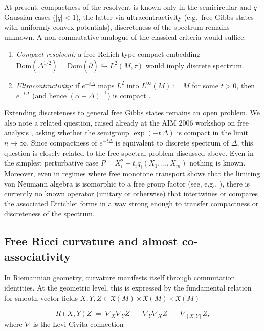 \documentclass[10pt,a4paper,reqno]{amsart}
\newcommand{\Dom}{\mathrm{Dom}}
\begin{document}
At present, compactness of the resolvent is known only in the
semicircular and $q$-Gaussian cases ($|q|<1$), the latter via
ultracontractivity \cite{Bozejko} (e.g.\ free Gibbs states with uniformly
convex potentials), discreteness of the spectrum remains unknown.  A
non-commutative analogue of the classical criteria would suffice:
\begin{enumerate}
  \item \emph{Compact resolvent:} a free Rellich-type compact embedding
        $\Dom(\Delta^{1/2})=\Dom(\bar\partial)\hookrightarrow L^2(M,\tau)$
        would imply discrete spectrum.
  \item \emph{Ultracontractivity:} if $e^{-t\Delta}$ maps $L^2$ into
        $L^\infty(M):=M$ for some $t>0$, then $e^{-t\Delta}$ (and hence
        $(\alpha+\Delta)^{-1}$) is compact
        \cite{CiprianiSauvageot2003}.
\end{enumerate}

Extending discreteness to general
free Gibbs states remains an open problem.
We also note a related question, raised already at the AIM 2006 workshop on free analysis
\cite{Aim}, 
asking whether the semigroup $\exp(-t\,\Delta)$ is compact in the limit
$n\to\infty$.  Since compactness of $e^{-t\Delta}$ is equivalent to
discrete spectrum of $\Delta$, this question is closely related to the
free spectral problem discussed above.  Even in the simplest perturbative
case $P=X_i^2+t_i q_i(X_1,\ldots,X_m)$ nothing is known. Moreover, even in regimes where free monotone transport shows
that the limiting von Neumann algebra is isomorphic to a free group factor
(see, e.g., \cite{GS}), there is currently no known operator (unitary or otherwise) that intertwines or compares the associated Dirichlet forms in a way strong enough to transfer compactness or discreteness of the spectrum.



\subsection{Free Ricci curvature and almost co-associativity}\label{freericci}
In Riemannian geometry, curvature manifests itself through commutation identities.
At the geometric level, this is expressed by the fundamental relation for smooth vector fields $X,Y,Z\in \mathfrak{X}(M)\times \mathfrak{X}(M)\times \mathfrak{X}(M)$



\[
R(X,Y)Z \;=\; \nabla_X \nabla_Y Z \;-\; \nabla_Y \nabla_X Z \;-\; \nabla_{[X,Y]} Z ,
\]
where $\nabla$ is the Levi-Civita connection
\end{document}
